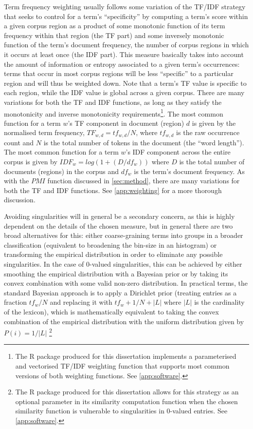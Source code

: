 Term frequency weighting usually follows some variation of the TF/IDF strategy \citep[ch. 6]{manning2008} that seeks to control for a term's ``specificity'' \citep{jones1973} by computing a term's score within a given corpus region as a product of some monotonic function of its term frequency within that region (the TF part) and some inversely monotonic function of the term's document frequency, the number of corpus regions in which it occurs at least once (the IDF part).
This measure basically takes into account the amount of information or entropy associated to a given term's occurrences: terms that occur in most corpus regions will be less ``specific'' to a particular region and will thus be weighted down.
Note that a term's TF value is specific to each region, while the IDF value is global across a given corpus.
There are many variations for both the TF and IDF functions, as long as they satisfy the monotonicity and inverse monotonicity requirements\footnote{
    \label{foot:tfidf_func}
    The  R package produced for this dissertation implements a parameterised and vectorised TF/IDF weighting function that supports most common versions of both weighting functions.
    See \autoref{app:software}.
}.
The most common function for a term $w$'s TF component in document (region) $d$ is given by the normalised term frequency, $TF_{w,d} = tf_{w,d} / N$, where $tf_{w,d}$ is the raw occurrence count and $N$ is the total number of tokens in the document (the ``word length'').
The most common function for a term $w$'s IDF component across the entire corpus is given by $IDF_{w} = log( 1 + ( D / df_w ) )$ where $D$ is the total number of documents (regions) in the corpus and $df_w$ is the term's document frequency.
As with the $PMI$ function discussed in \autoref{sec:method}, there are many variations for both the TF and IDF functions.
See \autoref{app:weighting} for a more thorough discussion.

Avoiding singularities will in general be a secondary concern, as this is highly dependent on the details of the chosen measure, but in general there are two broad alternatives for this: either coarse-graining terms into groups in a broader classification (equivalent to broadening the bin-size in an histogram) \citep{dedeo2013} or transforming the empirical distribution in order to eliminate any possible singularities.
In the case of $0$-valued singularities, this can be achieved by either smoothing the empirical distribution with a Bayesian prior or by taking its convex combination with some valid non-zero distribution.
In practical terms, the standard Bayesian approach is to apply a Dirichlet prior (treating entries as a fraction $tf_w / N$ and replacing it with $tf_w + 1 / N + |L|$ where $|L|$ is the cardinality of the lexicon), which is mathematically equivalent to taking the convex combination of the empirical distribution with the uniform distribution given by $P(i) = 1 / |L|$ \citep{telgarsky2011}\footnote{
    \label{foot:simdiv_func}
    The  R package produced for this dissertation allows for this strategy as an optional parameter in its similarity computation function when the chosen similarity function is vulnerable to singularities in 0-valued entries.
    See \autoref{app:software}.
}

